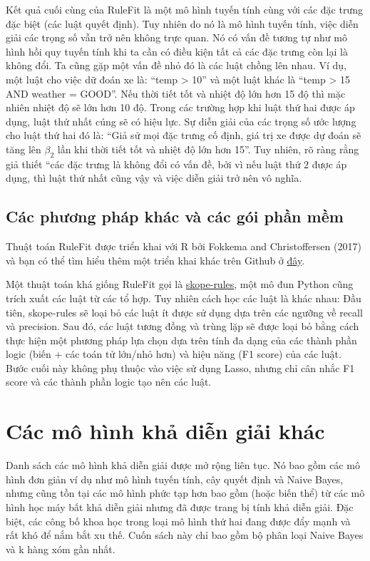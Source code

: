 Kết quả cuối cùng của RuleFit là một mô hình tuyến tính cùng với các đặc trưng đặc biệt (các luật quyết định). Tuy nhiên do nó là mô hình tuyến tính, việc diễn giải các trọng số vẫn trở nên không trực quan. Nó có vấn đề tương tự như mô hình hồi quy tuyến tính khi ta cần có điều kiện tất cả các đặc trưng còn lại là không đổi. Ta cũng gặp một vấn đề nhỏ đó là các luật chồng lên nhau. Ví dụ, một luật cho việc dữ đoán xe là: ``temp > 10'' và một luật khác là ``temp > 15 AND weather = GOOD''. Nếu thời tiết tốt và nhiệt độ lớn hơn 15 độ thì mặc nhiên nhiệt độ sẽ lớn hơn 10 độ. Trong các trường hợp khi luật thứ hai được áp dụng, luật thứ nhất cúng sẽ có hiệu lực. Sự diễn giải của các trọng số ước lượng cho luật thứ hai đó là: ``Giả sử mọi đặc trưng cố định, giá trị xe được dự đoán sẽ tăng lên $\beta_2$ lần khi thời tiết tốt và nhiệt độ lớn hơn 15''. Tuy nhiên, rõ ràng rằng giả thiết ``các đặc trưng là không đổi có vấn đề, bởi vì nếu luật thứ 2 được áp dụng, thì luật thứ nhất cũng vậy và việc diễn giải trở nên vô nghĩa.

\subsection{Các phương pháp khác và các gói phần mềm}

Thuật toán RuleFit được triển khai với R bởi Fokkema and Christoffersen (2017) và bạn có thể tìm hiểu thêm một triển khai khác trên Github ở \href{https://github.com/christophM/rulefit}{đây}.

Một thuật toán khá giống RuleFit gọi là \href{https://github.com/scikit-learn-contrib/skope-rules}{skope-rules}, một mô đun Python cũng trích xuất các luật từ các tổ hợp. Tuy nhiên cách học các luật là khác nhau: Đầu tiên, skope-rules sẽ loại bỏ các luật ít được sử dụng dựa trên các ngưỡng về recall và precision. Sau đó, các luật tương đồng và trùng lặp sẽ được loại bỏ bằng cách thực hiện một phương pháp lựa chọn dựa trên tính đa dạng của các thành phần logic (biến + các toán tử lớn/nhỏ hơn) và hiệu năng (F1 score) của các luật. Bước cuối này không phụ thuộc vào việc sử dụng Lasso, nhưng chỉ cân nhắc F1 score và các thành phần logic tạo nên các luật.

\section{Các mô hình khả diễn giải khác}

Danh sách các mô hình khả diễn giải được mở rộng liên tục. Nó bao gồm các mô hình đơn giản ví dụ như mô hình tuyến tính, cây quyết định và Naive Bayes, nhưng cũng tồn tại các mô hình phức tạp hơn bao gồm (hoặc biến thể) từ các mô hình học máy bất khả diễn giải nhưng đã được trang bị tính khả diễn giải. Đặc biệt, các công bố khoa học trong loại mô hình thứ hai đang được đẩy mạnh và rất khó để nắm bắt xu thế. Cuốn sách này chỉ bao gồm bộ phân loại Naive Bayes và k hàng xóm gần nhất.

